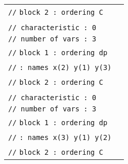 \documentclass{article}
\begin{document}
\begin{table}[htbp]
\begin{tabular}{ll}
		\texttt{//}  \hspace*{1.2cm}      \texttt{block   2 : ordering C} &   \\ \\
		\texttt{// characteristic : 0}         &  \\
		\texttt{// number of vars : 3}  &   \\
		\texttt{//} \hspace*{1.2cm} \texttt{block   1 : ordering dp}  &   \\
		\texttt{//} \hspace*{2.7cm}  \texttt{: names    x(2) y(1) y(3)}  &   \\
		\texttt{//}  \hspace*{1.2cm}      \texttt{block   2 : ordering C} &   \\ \\
		\texttt{// characteristic : 0}         &  \\
		\texttt{// number of vars : 3}  &   \\
		\texttt{//} \hspace*{1.2cm} \texttt{block   1 : ordering dp}  &   \\
		\texttt{//} \hspace*{2.7cm}  \texttt{: names    x(3) y(1) y(2)}  &   \\
		\texttt{//}  \hspace*{1.2cm}      \texttt{block   2 : ordering C} &   \\ 
	\end{tabular}
\end{table}
\end{document}
